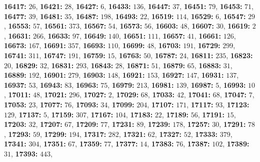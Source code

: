 \textsf{\bfseries 16417:} $26$, \textsf{\bfseries 16421:} $28$, \textsf{\bfseries 16427:} $6$, \textsf{\bfseries 16433:} $136$, \textsf{\bfseries 16447:} $37$, \textsf{\bfseries 16451:} $79$, \textsf{\bfseries 16453:} $71$, \textsf{\bfseries 16477:} $39$, \textsf{\bfseries 16481:} $35$, \textsf{\bfseries 16487:} $198$, \textsf{\bfseries 16493:} $22$, \textsf{\bfseries 16519:} $114$, \textsf{\bfseries 16529:} $6$, \textsf{\bfseries 16547:} $29$, \textsf{\bfseries 16553:} $57$, \textsf{\bfseries 16561:} $373$, \textsf{\bfseries 16567:} $54$, \textsf{\bfseries 16573:} $56$, \textsf{\bfseries 16603:} $48$, \textsf{\bfseries 16607:} $30$, \textsf{\bfseries 16619:} $2$, \textsf{\bfseries 16631:} $266$, \textsf{\bfseries 16633:} $97$, \textsf{\bfseries 16649:} $140$, \textsf{\bfseries 16651:} $111$, \textsf{\bfseries 16657:} $41$, \textsf{\bfseries 16661:} $126$, \textsf{\bfseries 16673:} $167$, \textsf{\bfseries 16691:} $357$, \textsf{\bfseries 16693:} $110$, \textsf{\bfseries 16699:} $48$, \textsf{\bfseries 16703:} $191$, \textsf{\bfseries 16729:} $299$, \textsf{\bfseries 16741:} $311$, \textsf{\bfseries 16747:} $191$, \textsf{\bfseries 16759:} $15$, \textsf{\bfseries 16763:} $50$, \textsf{\bfseries 16787:} $24$, \textsf{\bfseries 16811:} $235$, \textsf{\bfseries 16823:} $20$, \textsf{\bfseries 16829:} $32$, \textsf{\bfseries 16831:} $293$, \textsf{\bfseries 16843:} $28$, \textsf{\bfseries 16871:} $51$, \textsf{\bfseries 16879:} $65$, \textsf{\bfseries 16883:} $31$, \textsf{\bfseries 16889:} $192$, \textsf{\bfseries 16901:} $279$, \textsf{\bfseries 16903:} $148$, \textsf{\bfseries 16921:} $153$, \textsf{\bfseries 16927:} $147$, \textsf{\bfseries 16931:} $137$, \textsf{\bfseries 16937:} $53$, \textsf{\bfseries 16943:} $83$, \textsf{\bfseries 16963:} $75$, \textsf{\bfseries 16979:} $213$, \textsf{\bfseries 16981:} $139$, \textsf{\bfseries 16987:} $5$, \textsf{\bfseries 16993:} $10$, \textsf{\bfseries 17011:} $48$, \textsf{\bfseries 17021:} $296$, \textsf{\bfseries 17027:} $2$, \textsf{\bfseries 17029:} $68$, \textsf{\bfseries 17033:} $42$, \textsf{\bfseries 17041:} $68$, \textsf{\bfseries 17047:} $7$, \textsf{\bfseries 17053:} $23$, \textsf{\bfseries 17077:} $76$, \textsf{\bfseries 17093:} $34$, \textsf{\bfseries 17099:} $204$, \textsf{\bfseries 17107:} $171$, \textsf{\bfseries 17117:} $93$, \textsf{\bfseries 17123:} $129$, \textsf{\bfseries 17137:} $5$, \textsf{\bfseries 17159:} $307$, \textsf{\bfseries 17167:} $104$, \textsf{\bfseries 17183:} $22$, \textsf{\bfseries 17189:} $56$, \textsf{\bfseries 17191:} $15$, \textsf{\bfseries 17203:} $32$, \textsf{\bfseries 17207:} $67$, \textsf{\bfseries 17209:} $77$, \textsf{\bfseries 17231:} $89$, \textsf{\bfseries 17239:} $178$, \textsf{\bfseries 17257:} $30$, \textsf{\bfseries 17291:} $78$, \textsf{\bfseries 17293:} $59$, \textsf{\bfseries 17299:} $194$, \textsf{\bfseries 17317:} $282$, \textsf{\bfseries 17321:} $62$, \textsf{\bfseries 17327:} $52$, \textsf{\bfseries 17333:} $379$, \textsf{\bfseries 17341:} $304$, \textsf{\bfseries 17351:} $67$, \textsf{\bfseries 17359:} $77$, \textsf{\bfseries 17377:} $14$, \textsf{\bfseries 17383:} $76$, \textsf{\bfseries 17387:} $102$, \textsf{\bfseries 17389:} $31$, \textsf{\bfseries 17393:} $443$, 
